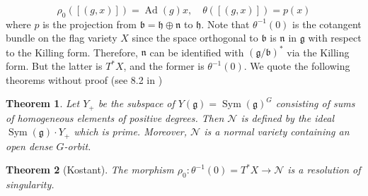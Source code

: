 \documentclass[11pt, a4paper]{article}
\newtheorem{theorem}{Theorem}[subsection]
\theoremstyle{definition}
\newcommand{\Sym}[0]{\operatorname{Sym}}
\newcommand{\h}{\mathfrak h}
\newcommand{\g}{\mathfrak g}
\begin{document}
    \[\rho_0([(g, x)])=\operatorname{Ad}(g)x,\quad\theta([(g, x)])=p(x)\]
    where $p$ is the projection from $\mathfrak b=\h\oplus\mathfrak n$ to $\h$. Note that $\theta^{-1}(0)$ is the cotangent bundle on the flag variety $X$ since the space orthogonal to $\mathfrak b$ is $\mathfrak n$ in $\g$ with respect to the Killing form. Therefore, $\mathfrak n$ can be identified with $(\g/\mathfrak b)^*$ via the Killing form. But the latter is $T^*X$, and the former is $\theta^{-1}(0)$. We quote the following theorems without proof (see 8.2 in \cite{dixmier-uea})
    \begin{theorem}\label{thm-nilpotent-cone}
        Let $Y_+$ be the subspace of $Y(\g)=\Sym(\g)^G$ consisting of sums of homogeneous elements of positive degrees. Then $\mathscr N$ is defined by the ideal $\Sym(\g)\cdot Y_+$ which is prime. Moreover, $\mathscr N$ is a normal variety containing an open dense $G$-orbit.
    \end{theorem}
    \begin{theorem}[Kostant]\label{thm-kostant}
        The morphism $\rho_0:\theta^{-1}(0)=T^*X\to\mathscr N$ is a resolution of singularity.
    \end{theorem}

    
\end{document}
